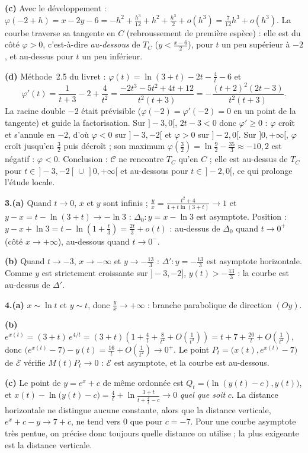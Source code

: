 \documentclass[a4paper,11pt]{article}
\numberwithin{equation}{section}
\numberwithin{figure}{section}
\numberwithin{table}{section}
\theoremstyle{enonce}
\theoremstyle{exemple}
\theoremstyle{remarque}
\begin{document}
\textbf{(c)} Avec le développement : $\varphi(-2+h)=x-2y-6=-h^2+\frac{h^3}{12}+h^2+\frac{h^3}2+o(h^3)=\frac7{12}h^3+o(h^3)$.
La courbe traverse sa tangente en $C$ (rebroussement de première espèce) : elle est du côté $\varphi>0$, c'est-à-dire
\emph{au-dessous} de $T_C$ ($y<\frac{x-6}2$), pour $t$ un peu supérieur à $-2$, et au-dessus pour $t$ un peu inférieur.

\textbf{(d)} Méthode~2.5 du livret : $\varphi(t)=\ln(3+t)-2t-\frac4t-6$ et
\[\varphi'(t)=\frac1{t+3}-2+\frac4{t^2}=\frac{-2t^3-5t^2+4t+12}{t^2(t+3)}=-\frac{(t+2)^2(2t-3)}{t^2(t+3)}.\]
La racine double $-2$ était prévisible ($\varphi(-2)=\varphi'(-2)=0$ en un point de la tangente) et guide la factorisation.
Sur $]-3,0[$, $2t-3<0$ donc $\varphi'\geq0$ : $\varphi$ croît et s'annule en $-2$, d'où $\varphi<0$ sur $]-3,-2[$ et $\varphi>0$ sur
$]-2,0[$. Sur $]0,+\infty[$, $\varphi$ croît jusqu'en $\frac32$ puis décroît ; son maximum
$\varphi\left(\frac32\right)=\ln\frac92-\frac{35}3\approx-10{,}2$ est négatif : $\varphi<0$. Conclusion : $\mathcal C$ ne rencontre
$T_C$ qu'en $C$ ; elle est au-dessus de $T_C$ pour $t\in\,]-3,-2[\,\cup\,]0,+\infty[$ et au-dessous pour $t\in\,]-2,0[$, ce
qui prolonge l'étude locale.

\textbf{3.(a)} Quand $t\to0$, $x$ et $y$ sont infinis ; $\frac yx=\frac{t^2+4}{4+t\ln(3+t)}\to1$ et
$y-x=t-\ln(3+t)\to-\ln3$ : $\Delta_0:y=x-\ln3$ est asymptote. Position :
$y-x+\ln3=t-\ln\left(1+\frac t3\right)=\frac{2t}3+o(t)$ : au-dessus de $\Delta_0$ quand $t\to0^+$ (côté $x\to+\infty$),
au-dessous quand $t\to0^-$.

\textbf{(b)} Quand $t\to-3$, $x\to-\infty$ et $y\to-\frac{13}3$ : $\Delta':y=-\frac{13}3$ est asymptote horizontale. Comme $y$
est strictement croissante sur $]-3,-2]$, $y(t)>-\frac{13}3$ : la courbe est au-dessus de $\Delta'$.

\textbf{4.(a)} $x\sim\ln t$ et $y\sim t$, donc $\frac yx\to+\infty$ : branche parabolique de direction $(Oy)$.

\textbf{(b)} $e^{x(t)}=(3+t)\,e^{4/t}=(3+t)\left(1+\frac4t+\frac8{t^2}+O\!\left(\frac1{t^3}\right)\right)=t+7+\frac{20}t+O\!\left(\frac1{t^2}\right)$,
donc $\big(e^{x(t)}-7\big)-y(t)=\frac{16}t+O\!\left(\frac1{t^2}\right)\to0^+$. Le point $P_t=\big(x(t),e^{x(t)}-7\big)$ de
$\mathcal E$ vérifie $M(t)P_t\to0$ : $\mathcal E$ est asymptote, et la courbe est au-dessous.

\textbf{(c)} Le point de $y=e^x+c$ de même ordonnée est $Q_t=\big(\ln(y(t)-c),y(t)\big)$, et
$x(t)-\ln\big(y(t)-c\big)=\frac4t+\ln\frac{3+t}{t+\frac4t-c}\to0$ \emph{quel que soit} $c$. La distance horizontale ne
distingue aucune constante, alors que la distance verticale, $e^x+c-y\to7+c$, ne tend vers $0$ que pour $c=-7$. Pour une courbe
asymptote très pentue, on précise donc toujours quelle distance on utilise ; la plus exigeante est la distance verticale.
\end{document}
